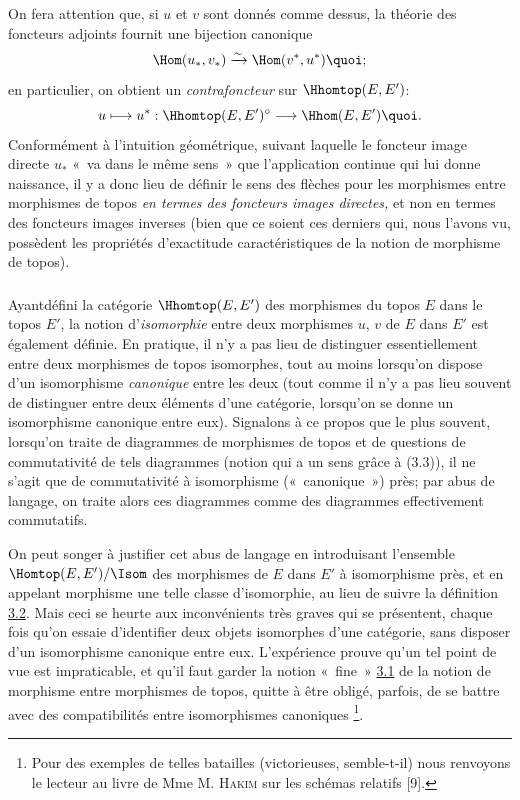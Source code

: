 \documentclass[10pt]{../fichiers-configuration-latex/smfart}
\begin{document}
\subsubsection{}
On fera attention que, si $u$ et $v$ sont donnés comme dessus, la
théorie des foncteurs adjoints fournit une bijection canonique
$$
\Hom(u_{\ast},v_{\ast})\xrightarrow{\sim}\Hom(v^{\ast},
u^{\ast}){\quoi};
$$
en particulier, on obtient un \emph{contrafoncteur} sur
$\Hhomtop(E,E')$:
$$
u\longmapsto u^{\ast}:\Hhomtop(E,E')^{\circ}\longrightarrow
\Hhom(E,E'){\quoi}.
$$
Conformément à l'intuition géométrique, suivant laquelle le
foncteur image directe $u_{\ast}$ « va dans le même sens »
que l'application continue qui lui donne naissance, il y a donc lieu
de définir le sens des flèches pour les morphismes entre
morphismes de topos \emph{en termes des foncteurs images directes,}
et non en termes des foncteurs images inverses (bien que ce soient
ces derniers qui, nous l'avons vu, possèdent les propriétés
d'exactitude caractéristiques de la notion de morphisme de topos).

\subsubsection{}
Ayant\pageoriginale  défini la catégorie $\Hhomtop(E,E')$ des
morphismes du topos $E$ dans le topos $E'$, la notion
d'\emph{isomorphie} entre deux morphismes $u$, $v$ de $E$ dans $E'$
est également définie. En pratique, il n'y a pas lieu de
distinguer essentiellement entre deux morphismes de topos
isomorphes, tout au moins lorsqu'on dispose d'un isomorphisme
\emph{canonique} entre les deux (tout comme il n'y a pas lieu
souvent de distinguer entre deux éléments d'une catégorie,
lorsqu'on se donne un isomorphisme canonique entre eux). Signalons
à ce propos que le plus souvent, lorsqu'on traite de diagrammes de
morphismes de topos et de questions de commutativité de tels
diagrammes (notion qui a un sens grâce à (3.3)), il ne s'agit
que de commutativité à isomorphisme (« canonique ») près;
par abus de langage, on traite alors ces diagrammes comme des
diagrammes effectivement commutatifs.

On peut songer à justifier cet abus de langage en introduisant
l'ensemble \\ $\Homtop(E,E')/\Isom$ des morphismes de $E$ dans $E'$ à
isomorphisme près, et en appelant morphisme une telle classe
d'isomorphie, au lieu de suivre la définition \hyperref[IV.subsec3.2]{3.2}.
Mais ceci se heurte aux inconvénients très graves qui se présentent,
chaque fois qu'on essaie d'identifier deux objets isomorphes d'une
catégorie, sans disposer d'un isomorphisme canonique entre eux.
L'expérience prouve qu'un tel point de vue est impraticable, et
qu'il faut garder la notion « fine » \hyperref[IV.def3.1]{3.1} de la
notion de morphisme entre morphismes de topos, quitte à être obligé,
parfois, de se battre avec des compatibilités entre isomorphismes
canoniques \footnote[1]{Pour des exemples de telles batailles
(victorieuses, semble-t-il) nous renvoyons le lecteur au livre de
Mme M. \textsc{Hakim} sur les schémas relatifs [9].}.
\end{document}
